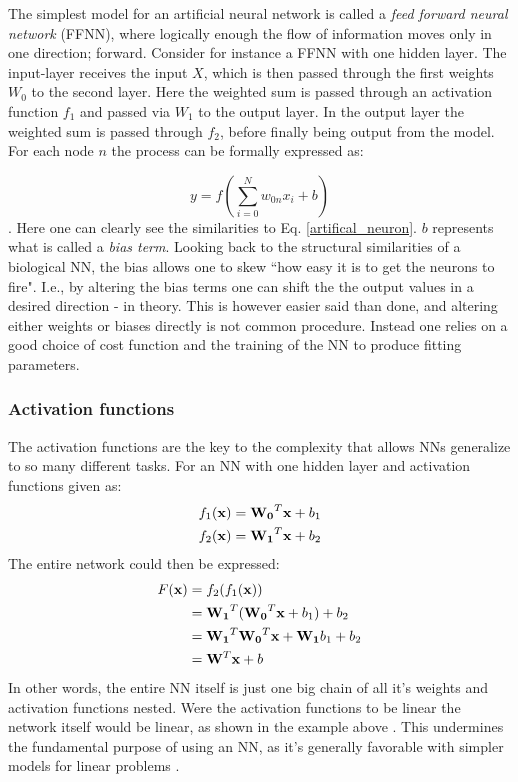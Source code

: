 The simplest model for an artificial neural network is called a \textit{feed forward neural network} (FFNN), where logically enough the flow of information moves only in one direction; forward. Consider for instance a FFNN with one hidden layer. The input-layer receives the input $X$, which is then passed through the first weights $W_0$ to the second layer. Here the weighted sum is passed through an activation function $f_1$ and passed via $W_1$ to the output layer. In the output layer the weighted sum is passed through $f_2$, before finally being output from the model. 
For each node $n$ the process can be formally expressed as:


\begin{equation}
    y = f\left( \sum_{i=0}^N w_{0n}x_i + b\right)
\end{equation}
\citep[p.17]{Ketkar2017}. Here one can clearly see the similarities to Eq. \ref{artifical_neuron}. $b$ represents what is called a \textit{bias term}. Looking back to the structural similarities of a biological NN, the bias allows one to skew ``how easy it is to get the neurons to fire". I.e., by altering the bias terms one can shift the the output values in a desired direction - in theory. This is however easier said than done, and altering either weights or biases directly is not common procedure. Instead one relies on a good choice of cost function and the training of the NN to produce fitting parameters. 


\subsubsection{Activation functions}\label{sec:activation_func}

The activation functions are the key to the complexity that allows NNs generalize to so many different tasks. For an NN with one hidden layer and activation functions given as:
\begin{align}
\begin{split}
    f_1(\bold{x})&=\bold{W_0}^T\bold{x} + b_1 \\
    f_2(\bold{x})&=\bold{W_1}^T\bold{x} + b_2 
\end{split}
\end{align}
The entire network could then be expressed: 
\begin{align}\label{linear_nn}
    \begin{split}
        F(\bold{x})&=f_2(f_1(\bold{x})) \\
        &= \bold{W_1}^T(\bold{W_0}^T\bold{x} + b_1) + b_2 \\
        &= \bold{W_1}^T\bold{W_0}^T\bold{x}+\bold{W_1}b_1+b_2 \\
        &=\bold{W}^T\bold{x}+b
    \end{split}
\end{align}
In other words, the entire NN itself is just one big chain of all it's weights and activation functions nested. Were the activation functions to be linear the network itself would be linear, as shown in the example above \citep[p.168]{Goodfellow-et-al-2016}. This undermines the fundamental purpose of using an NN, as it's generally favorable with simpler models for linear problems \cite{project2}. 

